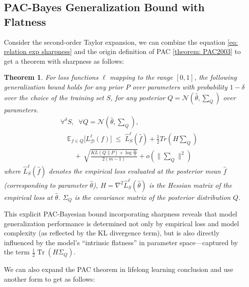 \documentclass[letterpaper]{article} %
\newtheorem{theorem}{Theorem}
\begin{document}
\subsection{PAC-Bayes Generalization Bound with Flatness}

Consider the second-order Taylor expansion, we can combine the equation \ref{eq: relation exp sharpness} and the origin definition of PAC \ref{theorem: PAC2003} to get a theorem with sharpness as follows: 

\begin{theorem} \label{theorem: PAC-sharpness}
For loss functions $\ell$ mapping to the range $[0,1]$, the following generalization bound holds for any prior $P$ over parameters with probability $1 - \delta$ over the choice of the training set $S$, for any posterior $Q=\mathcal{N}(\hat{\theta},\sum_{Q})$ over parameters.
\begin{equation}\label{eq:PAC2003}
\begin{aligned}
    &\forall^{\delta} S,\;\; \forall Q=\mathcal{N}(\hat{\theta},\sum_{Q}), \\
    &\quad
    \mathbb{E}_{{f} \in Q}\big[L_{\mathcal{D}}^{\ell}(f)\big] \;\leq\;
   \widehat{L}^{\ell}_{S}(\hat{f}) +  \frac{1}{2}Tr(H\sum_Q) \\
    &\qquad
    +\, \sqrt{
        \frac{
            KL(Q\|P) + \log\frac{m}{\delta}
        }{
            2(m-1)
        }
    } 
    +o(\|\sum_Q\|^2)
\end{aligned}
\end{equation}
where  $\hat{L}_S^\ell(\hat{f})$ denotes the empirical loss evaluated at the posterior mean $\hat{f}$ (corresponding to parameter $\hat{\theta}$),
$H = \nabla^2 \hat{L}_S^\ell(\hat{\theta})$ is the Hessian matrix of the empirical loss at $\hat{\theta}$. $\Sigma_Q$ is the covariance matrix of the posterior distribution $Q$.
\end{theorem}
 This explicit PAC-Bayesian bound incorporating sharpness reveals that model generalization performance is determined not only by empirical loss and model complexity (as reflected by the KL divergence term), but is also directly influenced by the model’s “intrinsic flatness” in parameter space—captured by the term $\frac{1}{2} \operatorname{Tr}(H\Sigma_Q)$.

 We can also expand the PAC theorem in lifelong learning conclusion and use another form to get as follows: 
 
\end{document}

